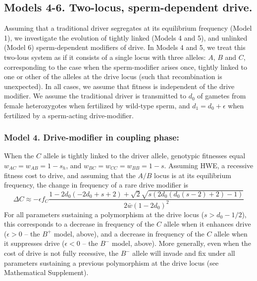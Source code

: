 \documentclass[12pt,letterpaper]{article}
\newcommand{\gc}[1]{{ \color{red} #1}}
\newcommand{\yb}[1]{{ \color{blue} #1}}
\begin{document}
\subsection*{Models 4-6. Two-locus, sperm-dependent drive.} 
Assuming that a traditional driver segregates at its equilibrium frequency (Model 1), we investigate the evolution of tightly linked (Models 4 and 5), and unlinked (Model 6) sperm-dependent modifiers of drive. 
In Models 4 and 5, we treat this two-lous system as if it consists of
a single locus with three alleles: $A$, $B$ and $C$, corresponding to the case when the
sperm-modifier arises once, tightly linked to one or other of the
alleles at the drive locus (such that recombination is unexpected). 
In all cases, we assume that fitness is independent of the drive modifier. %
We assume the traditional driver is transmitted to $d_0$ of gametes from female heterozygotes  when fertilized by wild-type sperm, and $d_1=d_0+\epsilon$ when fertilized by a sperm-acting drive-modifier.

\subsubsection*{Model 4. Drive-modifier in coupling phase:}
When the $C$ allele is tightly linked to the driver allele, 
	genotypic fitnesses equal $w_{AC}=w_{AB}=1-s_h$, and $w_{BC}=w_{CC}=w_{BB}=1-s$. 
Assuming HWE, a recessive fitness cost to drive, and assuming that the $A/B$ locus is at its equilibrium frequency, the change in frequency of a rare drive modifier is
\begin{equation}
	\Delta C\approx -\epsilon f_C \frac{ 1-2 d_0 (-2 d_0+s+2)+\sqrt{2} \sqrt{s (2 d_0 (d_0(s-2)+2)-1)}}{2 \bar{w}(1-2 d_0)^2}
	\label{coupling}
\end{equation}
For all parameters sustaining a polymorphism at the drive locus ($s>d_0-1/2$), this corresponds to a decrease in frequency of the $C$ allele when it enhances drive ($\epsilon >0$ -- the $B^+$ model, above), 
	and a decrease in frequency of the $C$ allele when it suppresses drive ($\epsilon <0$ -- the $B^-$ model, above). 
More generally, even when the cost of drive is not fully recessive, the $B^-$ allele will invade and fix under all parameters sustaining a previous polymorphism at the drive locus (see Mathematical Supplement). 
\end{document}
